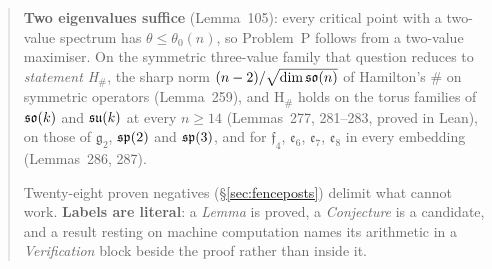 \begin{abstract}
\textbf{Two eigenvalues suffice} (Lemma~105): every critical point with a two-value spectrum has $\theta\le\theta_0(n)$, so Problem~P follows from a two-value maximiser. On the symmetric three-value family that question reduces to \emph{statement H$_\#$}, the sharp norm $(n-2)/\sqrt{\dim\so(n)}$ of Hamilton's $\#$ on symmetric operators (Lemma~259), and H$_\#$ holds on the torus families of $\so(k)$ and $\su(k)$ at every $n\ge14$ (Lemmas~277, 281--283, proved in Lean), on those of $\mathfrak g_2$, $\sype(2)$ and $\sype(3)$, and for $\mathfrak f_4$, $\mathfrak e_6$, $\mathfrak e_7$, $\mathfrak e_8$ in every embedding (Lemmas~286, 287).

Twenty-eight proven negatives (\S\ref{sec:fenceposts}) delimit what cannot work. \textbf{Labels are literal}: a \emph{Lemma} is proved, a \emph{Conjecture} is a candidate, and a result resting on machine computation names its arithmetic in a \emph{Verification} block beside the proof rather than inside it.
\end{abstract}

